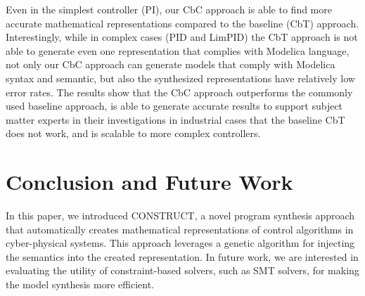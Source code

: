 \documentclass[10pt,conference]{IEEEtran}
\newcommand{\ali}[1]{\textcolor{blue}{{\it Ali:#1}}}
\begin{document}
 Even in the simplest controller (PI), our CbC approach is able to find more accurate mathematical representations compared to the baseline (CbT) approach. Interestingly, while in complex cases (PID and LimPID) the CbT approach is not able to generate even one representation that complies with Modelica language, not only our CbC approach can generate models that comply with Modelica syntax and semantic, but also the synthesized representations have relatively low error rates. The results show that the CbC approach outperforms the commonly used baseline approach, is able to generate accurate results to support subject matter experts in their investigations in industrial cases that the baseline CbT does not work, and is scalable to more complex controllers. 


\section{Conclusion and Future Work}
\label{sec:Conclusion}
In this paper, we introduced CONSTRUCT, a novel program synthesis approach that automatically creates mathematical representations of control algorithms in cyber-physical systems. This approach leverages a genetic algorithm for injecting the semantics into the created representation. In future work, we are interested in evaluating the utility of constraint-based solvers, such as SMT solvers, for making the model synthesis more efficient.



\end{document}
